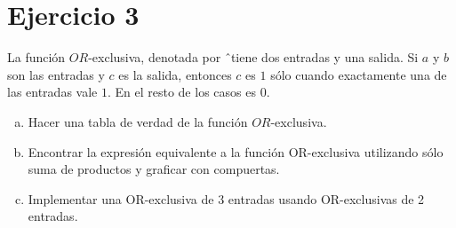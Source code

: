 \documentclass{article}
\begin{document}
\section*{Ejercicio 3}
La función $OR$-exclusiva, denotada por \^ \ tiene dos entradas y una salida. Si $a$ y $b$ son las entradas y $c$ es la salida, entonces $c$ es $1$ sólo cuando exactamente una de las entradas vale $1$. En el resto de los casos es $0$.
\begin{enumerate}[a)]
    \item Hacer una tabla de verdad de la función $OR$-exclusiva.
    \item Encontrar la expresión equivalente a la función OR-exclusiva utilizando sólo suma de productos y graficar con compuertas.
    \item Implementar una OR-exclusiva de 3 entradas usando OR-exclusivas de 2 entradas.
\end{enumerate}
\end{document}
